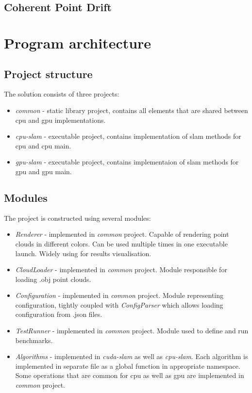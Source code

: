 \documentclass[titlepage]{article}
\begin{document}
\subsection{Coherent Point Drift}

\section{Program architecture}
\subsection{Project structure}
The solution consists of three projects:
\begin{itemize}
\item \textit{common} - static library project, contains all elements that are shared between cpu and gpu implementations.
\item \textit{cpu-slam} - executable project, contains implementation of slam methods for cpu and cpu main.
\item \textit{gpu-slam} - executable project, contains implementaion of slam methods for gpu and gpu main.
\end{itemize}

\subsection{Modules}
The project is constructed using several modules:
\begin{itemize}
\item \textit{Renderer} - implemented in \textit{common} project. Capable of rendering point clouds in different colors. Can be used multiple times in one executable launch. Widely using for results visualisation.
\item \textit{CloudLoader} - implemented in \textit{common} project. Module responsible for loading .obj point clouds.
\item \textit{Configuration} - implemented in \textit{common} project. Module representing configuration, tightly coupled with \textit{ConfigParser} which allows loading configuration from .json files.
\item \textit{TestRunner} - implemented in \textit{common} project. Module used to define and run benchmarks.
\item \textit{Algorithms} - implemented in \textit{cuda-slam} as well as \textit{cpu-slam}. Each algorithm is implemented in separate file as a global function in appropriate namespace. Some operations that are common for cpu as well as gpu are implemented in \textit{common} project.
\end{itemize}
\end{document}
